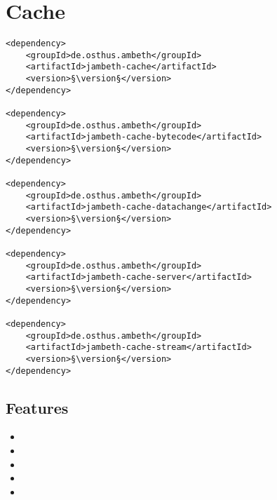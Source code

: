 \section{Cache}
\label{module:Cache}
\ClearAPI
\TODO
\begin{lstlisting}[style=POM,caption={Maven modules to use \emph{Ambeth Cache}}]
<dependency>
	<groupId>de.osthus.ambeth</groupId>
	<artifactId>jambeth-cache</artifactId>
	<version>§\version§</version>
</dependency>

<dependency>
	<groupId>de.osthus.ambeth</groupId>
	<artifactId>jambeth-cache-bytecode</artifactId>
	<version>§\version§</version>
</dependency>

<dependency>
	<groupId>de.osthus.ambeth</groupId>
	<artifactId>jambeth-cache-datachange</artifactId>
	<version>§\version§</version>
</dependency>

<dependency>
	<groupId>de.osthus.ambeth</groupId>
	<artifactId>jambeth-cache-server</artifactId>
	<version>§\version§</version>
</dependency>

<dependency>
	<groupId>de.osthus.ambeth</groupId>
	<artifactId>jambeth-cache-stream</artifactId>
	<version>§\version§</version>
</dependency>
\end{lstlisting}
\subsection{Features}
\begin{itemize}
	\item {}
	\item {}
	\item {}
	\item {}
	\item {}
\end{itemize}

